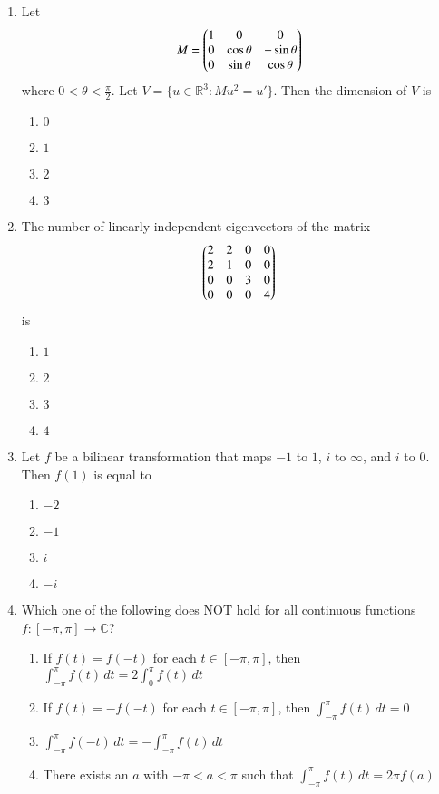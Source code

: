 \documentclass[journal]{IEEEtran}
\numberwithin{equation}{enumi}
\numberwithin{figure}{enumi}
\begin{document}
\begin{enumerate}
\item
Let
\[
M = \begin{pmatrix}1 & 0 & 0 \\ 0 & \cos\theta & -\sin\theta \\ 0 & \sin\theta & \cos\theta\end{pmatrix}
\]
where $0 < \theta < \frac{\pi}{2}$. Let $V = \{ u \in \mathbb{R}^3 : M u^2 = u' \}$. Then the dimension of $V$ is
\hfill{}
\begin{multicols}{4}
\begin{enumerate}
    \item $0$
    \item $1$
    \item $2$
    \item $3$
\end{enumerate}
\end{multicols}


\item
The number of linearly independent eigenvectors of the matrix
\[
\begin{pmatrix}2 & 2 & 0 & 0 \\ 2 & 1 & 0 & 0 \\ 0 & 0 & 3 & 0 \\ 0 & 0 & 0 & 4\end{pmatrix}
\]
is
\hfill{}
\begin{multicols}{4}
\begin{enumerate}
    \item $1$
    \item $2$
    \item $3$
    \item $4$
\end{enumerate}
\end{multicols}

\item
Let $f$ be a bilinear transformation that maps $-1$ to $1$, $i$ to $\infty$, and $i$ to $0$. Then $f(1)$ is equal to
\hfill{}
\begin{multicols}{4}
\begin{enumerate}
    \item $-2$
    \item $-1$
    \item $i$
    \item $-i$
\end{enumerate}
\end{multicols}


\item
Which one of the following does NOT hold for all continuous functions $f : [-\pi, \pi] \rightarrow \mathbb{C}$?
\hfill{}
\begin{enumerate}
    \item If $f(t) = f(-t)$ for each $t \in [-\pi, \pi]$, then $\int_{-\pi}^{\pi} f(t) \, dt = 2 \int_0^\pi f(t)\, dt$
    \item If $f(t) = -f(-t)$ for each $t \in [-\pi, \pi]$, then $\int_{-\pi}^{\pi} f(t) \, dt = 0$
    \item $\int_{-\pi}^{\pi} f(-t) \, dt = -\int_{-\pi}^{\pi} f(t)\, dt$
    \item There exists an $a$ with $-\pi < a < \pi$ such that $\int_{-\pi}^{\pi} f(t)\, dt = 2\pi f(a)$
\end{enumerate}


\end{enumerate}
\end{document}
